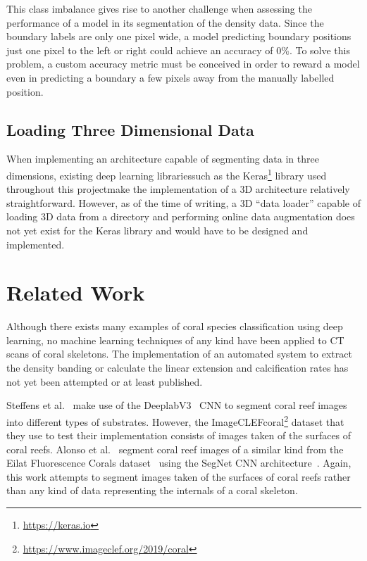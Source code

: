 This class imbalance gives rise to another challenge when assessing the performance of a model in its segmentation of the density data. Since the boundary labels are only one pixel wide, a model predicting boundary positions just one pixel to the left or right could achieve an accuracy of 0\%. To solve this problem, a custom accuracy metric must be conceived in order to reward a model even in predicting a boundary a few pixels away from the manually labelled position.

\subsection{Loading Three Dimensional Data}

When implementing an architecture capable of segmenting data in three dimensions, existing deep learning libraries\textemdash such as the Keras\footnote{\url{https://keras.io}} library used throughout this project\textemdash make the implementation of a 3D architecture relatively straightforward. However, as of the time of writing, a 3D ``data loader'' capable of loading 3D data from a directory and performing online data augmentation does not yet exist for the Keras library and would have to be designed and implemented.

\section{Related Work}

Although there exists many examples of coral species classification using deep learning, no machine learning techniques of any kind have been applied to CT scans of coral skeletons. The implementation of an automated system to extract the density banding or calculate the linear extension and calcification rates has not yet been attempted or at least published.

Steffens et al.~\cite{steff} make use of the DeeplabV3~\cite{deeplab} CNN to segment coral reef images into different types of substrates. However, the ImageCLEFcoral\footnote{\url{https://www.imageclef.org/2019/coral}} dataset that they use to test their implementation consists of images taken of the surfaces of coral reefs. Alonso et al.~\cite{alonso} segment coral reef images of a similar kind from the Eilat Fluorescence Corals dataset~\cite{eilat} using the SegNet CNN architecture~\cite{segnet}. Again, this work attempts to segment images taken of the surfaces of coral reefs rather than any kind of data representing the internals of a coral skeleton.

